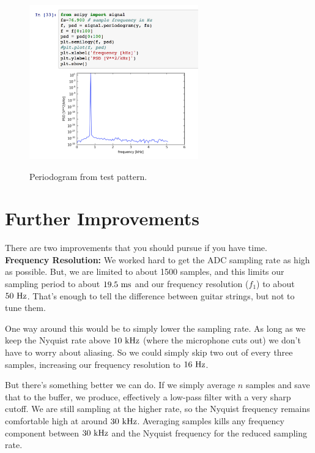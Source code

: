 \documentclass[12pt]{article}
\begin{document}
\begin{figure}[htbp]
\begin{center}
{\includegraphics[width=0.65\textwidth]{figs/periodogram.png}}
\end{center}
\caption{\label{fig:periodogram} Periodogram from test pattern.}
\end{figure}


\section{Further Improvements}

There are two improvements that you should pursue if you have time.\\

\noindent
{\bf Frequency Resolution:}  We worked hard to get the ADC sampling rate as high as possible.  But, we are limited to about 1500 samples, and this limits our sampling period to about $19.5~\rm ms$ and our frequency resolution ($f_1$) to about $50~\rm Hz$.  That's enough to tell the difference between guitar strings, but not to tune them.

One way around this would be to simply lower the sampling rate.  As long as we keep the Nyquist rate above $10~\rm kHz$ (where the microphone cuts out) we don't have to worry about aliasing.  So we could simply skip two out of every three samples, increasing our frequency resolution to $16~\rm Hz$.

But there's something better we can do.  If we simply average $n$ samples and save that to the buffer, we produce, effectively a low-pass filter with a very sharp cutoff.  We are still sampling at the higher rate, so the Nyquist frequency remains comfortable high at around $30~\rm kHz$.  Averaging samples kills any frequency component between $30~\rm kHz$ and the Nyquist frequency for the reduced sampling rate.\\
\end{document}
